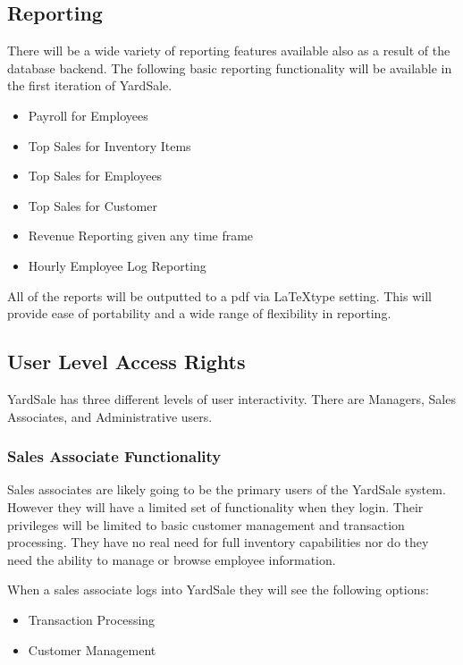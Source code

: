 \documentclass{book}
\begin{document}
\subsection{Reporting}

There will be a wide variety of reporting features available also as a result of the database backend. The following basic reporting functionality will be available in the first iteration of YardSale.

\begin{itemize}
\item{Payroll for Employees}
\item{Top Sales for Inventory Items}
\item{Top Sales for Employees}
\item{Top Sales for Customer}
\item{Revenue Reporting given any time frame}
\item{Hourly Employee Log Reporting}
\end{itemize}

All of the reports will be outputted to a pdf via \LaTeX type setting. This will provide ease of portability and a wide range of flexibility in reporting.


\subsection{User Level Access Rights}

YardSale has three different levels of user interactivity. There are Managers, Sales Associates, and Administrative users.

\subsubsection{Sales Associate Functionality}

Sales associates are likely going to be the primary users of the YardSale system. However they will have a limited set of functionality when they login. Their privileges will be limited to basic customer management and transaction processing. They have no real need for full inventory capabilities nor do they need the ability to manage or browse employee information.

When a sales associate logs into YardSale they will see the following options:

\begin{itemize}
\item Transaction Processing
\item Customer Management
\end{itemize}
\end{document}
